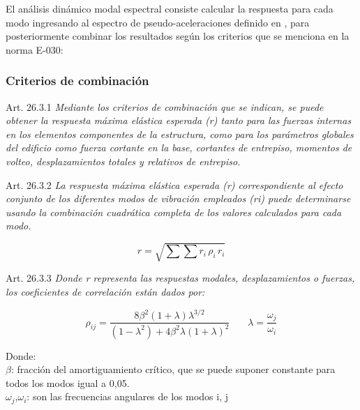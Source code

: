 El análisis dinámico modal espectral consiste calcular la respuesta para cada modo ingresando al espectro de pseudo-aceleraciones definido en , para posteriormente combinar los resultados según los criterios que se menciona en la norma E-030:

\subsubsection{Criterios de combinación}

\begin{mybox3}{Art. 26.3.1}
\textit{Mediante los criterios de combinación que se indican, se puede obtener la respuesta máxima elástica esperada (r) tanto para las fuerzas internas en los elementos componentes de la estructura, como para los parámetros globales 
del edificio como fuerza cortante en la base, cortantes de entrepiso, momentos 
de volteo, desplazamientos totales y relativos de entrepiso.}
\end{mybox3}

\begin{mybox3}{Art. 26.3.2}
\textit{La respuesta máxima elástica esperada (r) correspondiente al efecto conjunto 
de  los  diferentes  modos  de  vibración  empleados  (ri)  puede determinarse 
usando la combinación cuadrática completa de los valores calculados para 
cada modo.}
\end{mybox3}
\vspace{-0.8cm}
\begin{equation}
r=\sqrt{\sum \sum r_{i}\,\rho _{i}\,r_{i}}
\end{equation}

\begin{mybox3}{Art. 26.3.3}
\textit{Donde r representa las respuestas modales, desplazamientos o fuerzas, los coeficientes de correlación están dados por:}
\end{mybox3}

\vspace{-0.8cm}
\begin{equation}
\rho_{ij}=\frac{8\beta ^{2}\left ( 1+\lambda  \right )\lambda ^{3/2}}{\left ( 1-\lambda ^{2} \right )+4\beta ^{2}\lambda \left ( 1+\lambda  \right )^{2}}\,\,\,\,\,\,\,\,\,\,\,\lambda =\frac{\omega _{j}}{\omega _{i}}
\end{equation}

\begin{flushleft}
Donde:\\
$\beta$: fracción del amortiguamiento crítico, que se puede suponer constante para todos los modos igual a 0,05.\\
$\omega _{j}$,$\omega _{i}$: son las frecuencias angulares de los modos i, j\\
\end{flushleft}

